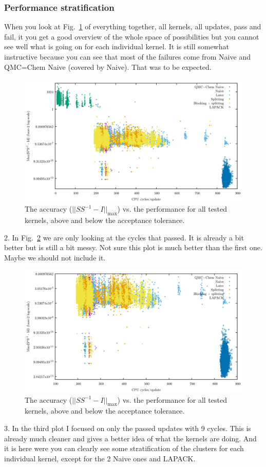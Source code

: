 \documentclass[11pt]{article}
\numberwithin{figure}{section}
\numberwithin{table}{section}
\begin{document}
		\subsubsection{Performance stratification}
		
		When you look at Fig.~\ref{fig:pareto_all} of everything together, all kernels, all updates, pass and fail, it you get a good overview of the whole space of possibilities but you cannot see well what is going on for each individual kernel. It is still somewhat instructive because you can see that most of the failures come from Naive and QMC=Chem Naive (covered by Naive). That was to be expected.
		\begin{figure}
			\includegraphics[width=\linewidth]{pareto_pass_fail_all.png}	
			\caption{The accuracy ($||SS^{-1}-I||_\mathrm{max}$) vs. the performance for all tested kernels, above and below the acceptance tolerance.}
			\label{fig:pareto_all}
		\end{figure}
		
2. In Fig.~\ref{fig:pareto_pass} we are only looking at the cycles that passed. It is already a bit better but is still a bit messy. Not sure this plot is much better than the first one. Maybe we should not include it.
		\begin{figure}
			\includegraphics[width=\linewidth]{pareto_pass_all.png}	
			\caption{The accuracy ($||SS^{-1}-I||_\mathrm{max}$) vs. the performance for all tested kernels, above and below the acceptance tolerance.}
			\label{fig:pareto_pass}
		\end{figure}
3. In the third plot I focused on only the passed updates with 9 cycles. This is already much cleaner and gives a better idea of what the kernels are doing. And it is here were you can clearly see some stratification of the clusters for each individual kernel, except for the 2 Naive ones and LAPACK.
\end{document}
